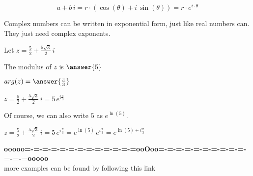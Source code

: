 \documentclass{ximera}
\begin{document}
\begin{center}


\[
a + b \, i =  r \cdot (\cos(\theta) + i \, \sin(\theta)) = r \cdot e^{i \cdot \theta}
\]

\end{center}


Complex numbers can be written in exponential form, just like real numbers can.  They just need complex exponents.



\begin{example}


Let $z = \frac{5}{2} + \frac{5\sqrt{3}}{2} \, i$

The modulus of $z$ is $\answer{5}$ 

$arg(z) = \answer{\frac{\pi}{3}}$


$z = \frac{5}{2} + \frac{5\sqrt{3}}{2} \, i = 5 \, e^{i \tfrac{\pi}{3}}$

\end{example}




Of course, we can also write $5$ as $e^{\ln(5)}$.


$z = \frac{5}{2} + \frac{5\sqrt{3}}{2} \, i = 5 \, e^{i \tfrac{\pi}{3}} = e^{\ln(5)} \, e^{i \tfrac{\pi}{3}} = e^{\ln(5) + i \tfrac{\pi}{3}}$












\begin{center}
\textbf{\textcolor{green!50!black}{ooooo=-=-=-=-=-=-=-=-=-=-=-=-=ooOoo=-=-=-=-=-=-=-=-=-=-=-=-=ooooo}} \\

more examples can be found by following this link\\ 

\end{center}
\end{document}
